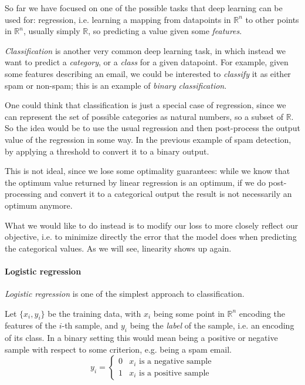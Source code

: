 
So far we have focused on one of the possible tasks that deep learning can be used for: regression, i.e. learning a mapping from datapoints in $\mathbb{R}^n$ to other points in $\mathbb{R}^n$, usually simply $\mathbb{R}$, so predicting a value given some \emph{features}.

\emph{Classification} is another very common deep learning task, in which instead we want to predict a \emph{category}, or a \emph{class} for a given datapoint. For example, given some features describing an email, we could be interested to \emph{classify} it as either spam or non-spam; this is an example of \emph{binary classification}. 

One could think that classification is just a special case of regression, since we can represent the set of possible categories as natural numbers, so a subset of $\mathbb{R}$. So the idea would be to use the usual regression and then post-process the output value of the regression in some way. In the previous example of spam detection, by applying a threshold to convert it to a binary output. 

This is not ideal, since we lose some optimality guarantees: while we know that the optimum value returned by linear regression is an optimum, if we do post-processing and convert it to a categorical output the result is not necessarily an optimum anymore.

What we would like to do instead is to modify our loss to more closely reflect our objective, i.e. to minimize directly the error that the model does when predicting the categorical values. As we will see, linearity shows up again.

\paragraph{Logistic regression}

\emph{Logistic regression} is one of the simplest approach to classification.

Let $\{x_i, y_i\}$ be the training data, with $x_i$ being some point in $\mathbb{R}^n$ encoding the features of the $i$-th sample, and $y_i$ being the \emph{label} of the sample, i.e. an encoding of its class. In a binary setting this would mean being a positive or negative sample with respect to some criterion, e.g. being a spam email.
\begin{equation}
    y_i = \begin{cases}
        0 & x_i \text{ is a negative sample} \\
        1 & x_i \text{ is a positive sample}
    \end{cases}
\end{equation}

